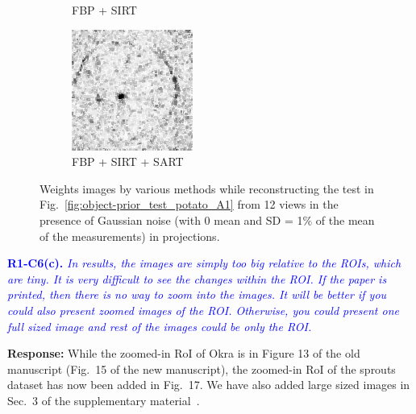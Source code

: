 \documentclass{article}
\begin{document}
\begin{figure}[!h]
\begin{subfigure}[b]{0.2\linewidth}
\captionsetup{labelformat=empty}
        \caption{FBP + SIRT}
    \end{subfigure}
    \quad
        \begin{subfigure}[b]{0.2\linewidth}
        \includegraphics[width=\textwidth]{../images/potato/artefacts/with_noise/weightsIm_fbp_sart_sirt30.png}
\captionsetup{labelformat=empty}
        \caption{FBP + SIRT + SART}
     \end{subfigure}
      \caption{Weights images by various methods while reconstructing the test in Fig.~\ref{fig:object-prior_test_potato_A1} from 12 views in the presence of Gaussian noise (with 0 mean and SD = 1$\%$ of the mean of the measurements) in projections.}
\label{fig:weights_with_noise}
\end{figure}
\textcolor{blue}{\textbf{R1-C6(c).}\textit{ In results, the images are simply too big relative to the ROIs, which are tiny. It is very difficult to see the changes within the ROI. If the paper is printed, then there is no way to zoom into the images. It will be better if you could also present zoomed images of the ROI. Otherwise, you could present one full sized image and rest of the images could be only the ROI. }}

\textbf{Response:} While the zoomed-in RoI of Okra is in Figure 13 of the old manuscript (Fig.~15 of the new manuscript), the zoomed-in RoI of the sprouts dataset has now been added in Fig.~17.  We have also added large sized images in Sec.~3 of the supplementary material~\cite{supp_paper}.\\
\end{document}
